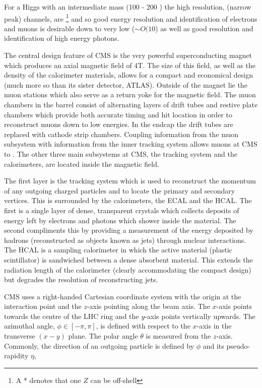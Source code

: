 For a Higgs with an intermediate mass (100 - 200 \GeV) the high resolution, (narrow peak) channels, are \HZZ \footnote{A * denotes that one $Z$ can be off-shell} and \Hgg so good energy resolution and identification of electrons and muons is desirable down to very low \pT ($\sim O(10$\GeV) as well as good resolution and identification of high energy photons. 

The central design feature of CMS is the very powerful superconducting magnet which produces an axial magnetic field of 4T. The size of this field, as well as the density of the calorimeter materials, allows for a compact and economical design (much more so than its sister detector, ATLAS). Outside of the magnet lie the muon stations which also serve as a return yoke for the magnetic field. The muon chambers in the barrel consist of alternating layers of drift tubes and restive plate chambers which provide both accurate timing and hit location in order to reconstruct muons down to low energies. In the endcap the drift tubes are replaced with cathode strip chambers. Coupling information from the muon subsystem with information from the inner tracking system allows muons at CMS to . The other three main subsystems at CMS, the tracking system and the calorimeters, are located inside the magnetic field.

The first layer is the tracking system which is used to reconstruct the momentum of any outgoing charged particles and to locate the primary and secondary vertices. This is surrounded by the calorimeters, the \acf{ECAL} and the \acf{HCAL}. The first is a single layer of dense, transparent crystals which collects deposits of energy left by electrons and photons which shower inside the material. The second compliments this by providing a measurement of the energy deposited by hadrons (reconstructed as objects known as jets) through nuclear interactions. The \acf{HCAL} is a sampling calorimeter in which the active material (plastic scintillator) is sandwiched between a dense absorbent material. This extends the radiation length of the calorimeter (clearly accommodating the compact design) but degrades the resolution of reconstructing jets. 

\ac{CMS} uses a right-handed Cartesian coordinate system with the origin at the interaction point and the $z$-axis pointing along the beam axis. The $x$-axis points towards the centre of the LHC ring and the $y$-axis points vertically upwards. The azimuthal angle, $\phi \in [-\pi,\pi]$, is defined with respect to the $x$-axis in the transverse $(x-y)$ plane. The polar angle $\theta$ is measured from the $z$-axis. Commonly, the direction of an outgoing particle is defined by $\phi$ and its pseudo-rapidity $\eta$,

